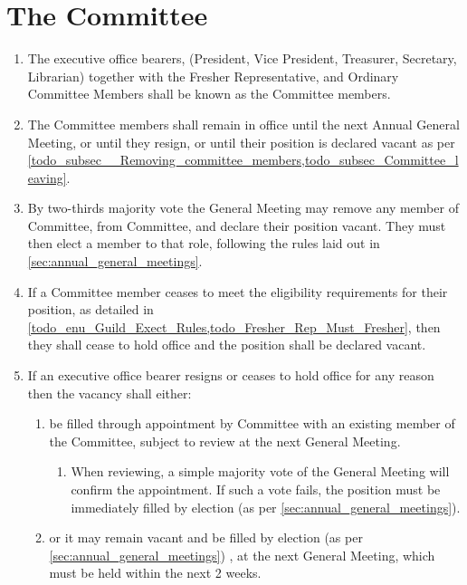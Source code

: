 \documentclass[a4paper]{article}
\begin{document}
\section{The Committee} \label{sec:committee}
\begin{enumerate}
    \item The executive office bearers, (President, Vice President, Treasurer, Secretary, Librarian) together with the Fresher Representative, and Ordinary Committee Members shall be known as the Committee members.
    \item The Committee members shall remain in office until the next Annual General Meeting, or until they resign, or until their position is declared vacant as per \cref{todo_subsec__Removing_committee_members,todo_subsec_Committee_leaving}.
    \item \label{todo_subsec__Removing_committee_members} By two-thirds majority vote the General Meeting may remove any member of Committee, from Committee, and declare their position vacant. They must then elect a member to that role, following the rules laid out in \cref{sec:annual_general_meetings}.
    \item \label{todo_subsec_Committee_leaving} If a Committee member ceases to meet the eligibility requirements for their position, as detailed in \cref{todo_enu_Guild_Exect_Rules,todo_Fresher_Rep_Must_Fresher}, then they shall cease to hold office and the position shall be declared vacant.
    \item \label{todo_subsec__OB_resign} If an executive office bearer resigns or ceases to hold office for any reason then the vacancy shall either:
          \begin{enumerate}
              \item be filled through appointment by Committee with an existing member of the Committee, subject to review at the next General Meeting.
                    \begin{enumerate}
                        \item When reviewing, a simple majority vote of the General Meeting will confirm the appointment. If such a vote fails, the position must be immediately filled by election (as per \cref{sec:annual_general_meetings}).
                    \end{enumerate}
              \item or it may remain vacant and be filled by election (as per \cref{sec:annual_general_meetings}) , at the next General Meeting, which must be held within the next 2 weeks.
          \end{enumerate}

\end{enumerate}
\end{document}
